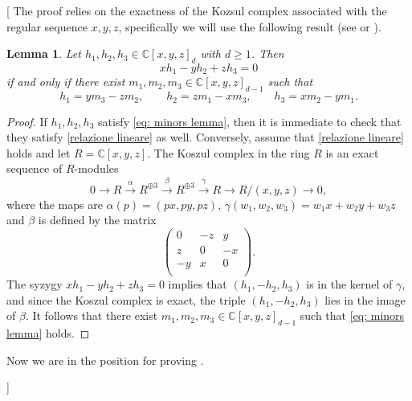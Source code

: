 \documentclass{amsart}
\theoremstyle{plain}
\newtheorem{lemma}{Lemma}[section]
\theoremstyle{definition}
\newcommand{\C}{\mathbb{C}}
\newcommand{\blue}[1]{{\color{blue}  [#1]}}
\begin{document}
\blue{
The proof relies on the exactness of the Kozsul complex associated with the regular sequence $x,y,z$, specifically we will use the following result (see \cite[Theorem 7.3.13]{Dolgachev} or \cite[Lemma 3.9]{BGV}).



\begin{lemma}\label{lem: Kozsul}
Let $h_1,h_2,h_3\in\C[x,y,z]_d$ with $d \ge 1$. Then 
\begin{equation}\label{relazione lineare}
xh_1-yh_2+zh_3=0
\end{equation}
 if and only if there exist $m_1,m_2,m_3\in\C[x,y,z]_{d-1}$ such that
\begin{equation}\label{eq: minors lemma}
    h_1 = ym_3-zm_2,\qquad h_2 = zm_1-xm_3,\qquad 
    h_3 = xm_2-ym_1.
\end{equation}

\end{lemma}

\begin{proof}
If $h_1,h_2,h_3$ satisfy \eqref{eq: minors lemma}, then it is immediate to check that they satisfy \eqref{relazione lineare} as well. Conversely, assume that \eqref{relazione lineare} holds and let $R = \C[x,y,z]$.
The Koszul complex in the ring
$R$ is an exact sequence of $R$-modules
$$
0\to R\xrightarrow{\alpha} R^{\oplus 3} \xrightarrow{\beta} R^{\oplus 3} \xrightarrow{\gamma} R \to R/(x,y,z)
\to 0,
$$
where the maps are  $\alpha(p)=(p x,p y,p z)$, $\gamma (w_1,w_2,w_3)=w_1 x + w_2 y + w_3 z$ and $\beta$ is defined by the matrix
$$
\left(
\begin{array}{ccc}
0 & -z & y\\
z & 0 & -x\\
-y & x & 0 \\
\end{array}
\right).
$$
The syzygy $xh_1-yh_2+zh_3=0$ implies that $(h_1, -h_2, h_3)$ is in the kernel of $\gamma$, and since the Koszul complex is exact, the triple $(h_1,-h_2, h_3)$ lies in the image of $\beta$. It follows that there exist $m_1,m_2,m_3\in\C[x,y,z]_{d-1}$ such that \eqref{eq: minors lemma} holds.
\end{proof}

Now we are in the position for proving \Cref{p2}.


}
\end{document}
